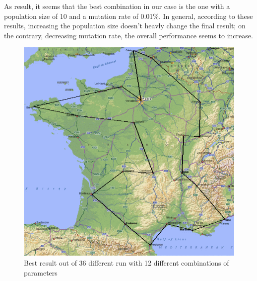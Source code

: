 \documentclass{article}
\begin{document}
As result, it seems that the best combination in our case is the one with a population size of 10 and a mutation rate of 0.01\%. In general, according to these results, increasing the population size doesn't heavly change the final result; on the contrary, decreasing mutation rate, the overall performance seems to increase.

\begin{figure}
\centering
\includegraphics[width=\textwidth]{../result/exercise3/10_1_3/best.png}
\caption{Best result out of 36 different run with 12 different combinations of parameters}
\end{figure}    
\end{document}
